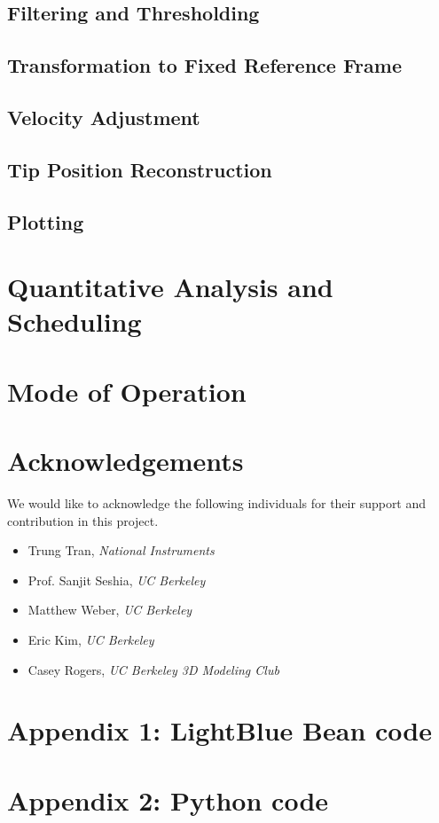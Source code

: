 \documentclass[12pt,journal]{IEEEtran}
\begin{document}
\subsection{Filtering and Thresholding}
\subsection{Transformation to Fixed Reference Frame}
\subsection{Velocity Adjustment}
\subsection{Tip Position Reconstruction}
\subsection{Plotting}

\section{Quantitative Analysis and Scheduling}

\section{Mode of Operation}

\section{Acknowledgements}
We would like to acknowledge the following individuals for their support and contribution in this project.
\begin{itemize}
\item Trung Tran, \textit{National Instruments}
\item Prof. Sanjit Seshia, \textit{UC Berkeley}
\item Matthew Weber, \textit{UC Berkeley}
\item Eric Kim, \textit{UC Berkeley}
\item Casey Rogers, \textit{UC Berkeley 3D Modeling Club}
\end{itemize}

\section{Appendix 1: LightBlue Bean code}

\section{Appendix 2: Python code}
\end{document}
